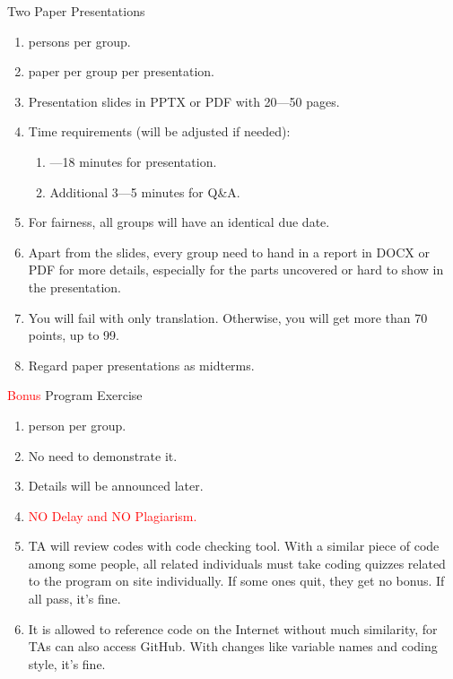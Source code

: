 \documentclass[aspectratio=169, 14pt, UTF8, t]{beamer}
\let\olditem\item
\renewcommand\item{\olditem\justifying}
\begin{document}
\begin{frame}{Two Paper Presentations}
  \begin{enumerate}
    \item 2 persons per group.
    \item 1 paper per group per presentation.
    \item Presentation slides in PPTX or PDF with 20---50 pages.
    \item Time requirements (will be adjusted if needed):
      \begin{enumerate}
        \item 15---18 minutes for presentation.
        \item Additional 3---5 minutes for Q\&A.
      \end{enumerate}
    \item For fairness, all groups will have an identical due date.
    \item Apart from the slides, every group need to hand in a report in DOCX or PDF for more details, especially for the parts uncovered or hard to show in the presentation.
    \item You will fail with only translation. Otherwise, you will get more than 70 points, up to 99.
    \item Regard paper presentations as midterms.
  \end{enumerate}
\end{frame}

\begin{frame}{\textcolor{red}{Bonus} Program Exercise}
  \begin{enumerate}
    \item 1 person per group.
    \item No need to demonstrate it.
    \item Details will be announced later.
    \item \textcolor{red}{NO Delay and NO Plagiarism.}
    \item TA will review codes with code checking tool. With a similar piece of code among some people, all related individuals must take coding quizzes related to the program on site individually. If some ones quit, they get no bonus. If all pass, it's fine.
    \item It is allowed to reference code on the Internet without much similarity, for TAs can also access GitHub. With changes like variable names and coding style, it's fine.
  \end{enumerate}
\end{frame}
\end{document}

